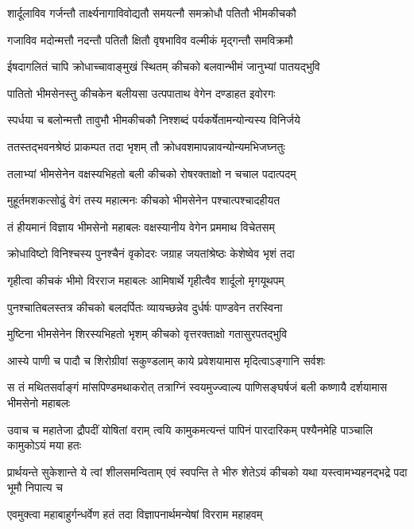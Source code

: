 \twolineshloka
{शार्दूलाविव गर्जन्तौ तार्क्ष्यनागाविवोद्यतौ}
{समयत्नौ समक्रोधौ पतितौ भीमकीचकौ}


\twolineshloka
{गजाविव मदोन्मत्तौ नदन्तौ पतितौ क्षितौ}
{वृषभाविव वल्मीकं मृद्गन्तौ समविक्रमौ}


\twolineshloka
{ईषदागलितं चापि क्रोधाच्चावाङ्मुखं स्थितम्}
{कीचको बलवान्भीमं जानुभ्यां पातयद्भुवि}


\twolineshloka
{पातितो भीमसेनस्तु कीचकेन बलीयसा}
{उत्पपाताथ वेगेन दण्डाहत इवोरगः}


\twolineshloka
{स्पर्धया च बलोन्मत्तौ तावुभौ भीमकीचकौ}
{निश्शब्दं पर्यकर्षेतामन्योन्यस्य विनिर्जये}


\twolineshloka
{ततस्तद्भवनश्रेष्ठं प्राकम्पत तदा भृशम्}
{तौ क्रोधवशमापन्नावन्योन्यमभिजघ्नतुः}


\twolineshloka
{तलाभ्यां भीमसेनेन वक्षस्यभिहतो बली}
{कीचको रोषरक्ताक्षो न चचाल पदात्पदम्}


\twolineshloka
{मुहूर्तमशकत्सोढुं वेगं तस्य महात्मनः}
{कीचको भीमसेनेन पश्चात्पश्चादहीयत}


\twolineshloka
{तं हीयमानं विज्ञाय भीमसेनो महाबलः}
{वक्षस्यानीय वेगेन प्रममाथ विचेतसम्}


\twolineshloka
{क्रोधाविष्टो विनिश्चस्य पुनश्चैनं वृकोदरः}
{जग्राह जयतांश्रेष्ठः केशेष्वेव भृशं तदा}


\twolineshloka
{गृहीत्वा कीचकं भीमो विरराज महाबलः}
{आमिषार्थे गृहीत्वैव शार्दूलो मृगयूथपम्}


\twolineshloka
{पुनश्चातिबलस्तत्र कीचको बलदर्पितः}
{व्यायच्छन्नेव दुर्धर्षः पाण्डवेन तरस्विना}


\twolineshloka
{मुष्टिना भीमसेनेन शिरस्यभिहतो भृशम्}
{कीचको वृत्तरक्ताक्षो गतासुरपतद्भुवि}


\twolineshloka
{आस्ये पाणी च पादौ च शिरोग्रीवां सकुण्डलाम्}
{काये प्रवेशयामास मृदित्वाऽङ्गानि सर्वशः}


\onelineshloka
{स तं मथितसर्वाङ्गं मांसपिण्डमथाकरोत्}
\twolineshloka
{तत्राग्निं स्वयमुज्ज्वाल्य पाणिसङ्घर्षजं बली}
{कष्णायै दर्शयामास भीमसेनो महाबलः}


\threelineshloka
{उवाच च महातेजा द्रौपदीं योषितां वराम्}
{त्वयि कामुकमत्यन्तं पापिनं पारदारिकम्}
{पश्यैनमेहि पाञ्चालि कामुकोऽयं मया हतः}


\threelineshloka
{प्रार्थयन्ते सुकेशान्ते ये त्वां शीलसमन्विताम्}
{एवं स्वपन्ति ते भीरु शेतेऽयं कीचको यथा}
{यस्त्वामभ्यहनद्भद्रे पदा भूमौ निपात्य च}


\twolineshloka
{एवमुक्त्वा महाबाहुर्गन्धर्वेण हतं तदा}
{विज्ञापनार्थमन्येषां विरराम महाहवम्}


